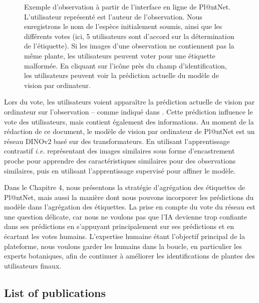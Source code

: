 \begin{figure}[h]
\begin{minipage}{.4\linewidth}
    \end{minipage}\par\medskip
        \caption{Exemple d'observation à partir de l'interface en ligne de Pl@ntNet. L'utilisateur représenté est l'auteur de l'observation. Nous enregistrons le nom de l'espèce initialement soumis, ainsi que les différents votes (ici, 5 utilisateurs sont d'accord sur la détermination de l'étiquette). Si les images d'une observation ne contiennent pas la même plante, les utilisateurs peuvent voter pour une étiquette malformée. En cliquant sur l'icône près du champ d'identification, les utilisateurs peuvent voir la prédiction actuelle du modèle de vision par ordinateur.}
    \end{figure}


Lors du vote, les utilisateurs voient apparaître la prédiction actuelle de vision par ordinateur sur l'observation -- comme indiqué dans . Cette prédiction influence le vote des utilisateurs, mais contient également des informations.
Au moment de la rédaction de ce document, le modèle de vision par ordinateur de Pl@ntNet est un réseau DINOv2 \citep{oquab2024dinov2} basé sur des transformateurs.
En utilisant l'apprentissage contrastif \citep{waida2023understanding} \emph{i.e.} représentant des images similaires sous forme d'encastrement proche pour apprendre des caractéristiques similaires pour des observations similaires, puis en utilisant l'apprentissage supervisé pour affiner le modèle.

Dans le Chapitre $4$, nous présentons la stratégie d'agrégation des étiquettes de Pl@ntNet, mais aussi la manière dont nous pouvons incorporer les prédictions du modèle dans l'agrégation des étiquettes.
La prise en compte du vote du réseau est une question délicate, car nous ne voulons pas que l'IA devienne trop confiante dans ses prédictions en s'appuyant principalement sur ses prédictions et en écartant les votes humains.
L'expertise humaine étant l'objectif principal de la plateforme, nous voulons garder les humains dans la boucle, en particulier les experts botaniques, afin de continuer à améliorer les identifications de plantes des utilisateurs finaux.

\clearpage
\subsection{List of publications}

